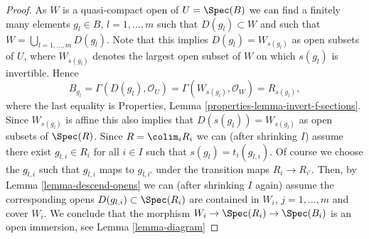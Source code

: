 \begin{proof}
\medskip\noindent
As $W$ is a quasi-compact open of $U = \Spec(B)$
we can find a finitely many elements $g_l \in B$, $l = 1, \ldots, m$
such that $D(g_l) \subset W$ and such that
$W = \bigcup_{l = 1, \ldots, m} D(g_l)$.
Note that this implies $D(g_l) = W_{s(g_l)}$ as open subsets of $U$,
where $W_{s(g_l)}$ denotes the largest open subset of $W$ on which
$s(g_l)$ is invertible. Hence
$$
B_{g_l} =
\Gamma(D(g_l), \mathcal{O}_U) =
\Gamma(W_{s(g_l)}, \mathcal{O}_W) = R_{s(g_l)},
$$
where the last equality is
Properties, Lemma \ref{properties-lemma-invert-f-sections}.
Since $W_{s(g_l)}$ is affine this also
implies that $D(s(g_l)) = W_{s(g_l)}$ as open subsets of $\Spec(R)$.
Since $R = \colim_i R_i$ we can (after shrinking $I$)
assume there exist $g_{l, i} \in R_i$ for all $i \in I$ such that
$s(g_l) = t_i(g_{l, i})$. Of course we choose the $g_{l, i}$
such that $g_{l, i}$ maps to $g_{l, i'}$ under the transition maps
$R_i \to R_{i'}$. Then, by Lemma \ref{lemma-descend-opens} we can
(after shrinking $I$ again)
assume the corresponding opens $D(g_{l, i}) \subset \Spec(R_i)$
are contained in $W_i$, $j = 1, \ldots, m$ and cover $W_i$.
We conclude that the morphism $W_i \to \Spec(R_i) \to \Spec(B_i)$
is an open immersion, see Lemma \ref{lemma-diagram}


\end{proof}
